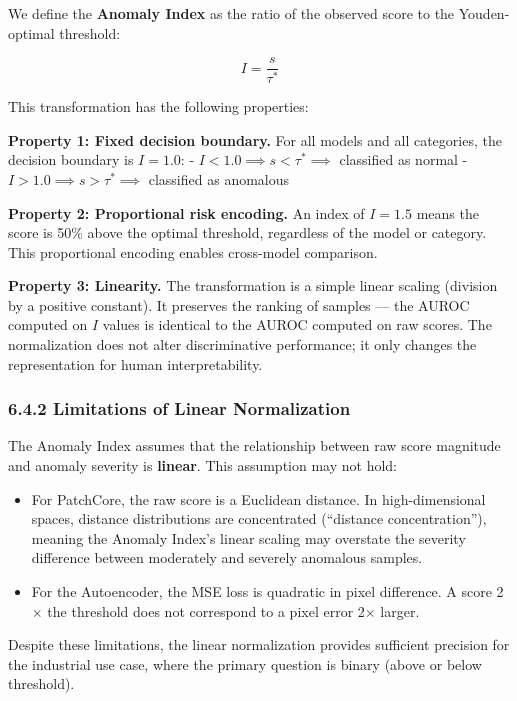 \documentclass[12pt, a4paper, oneside]{report}
\begin{document}
We define the \textbf{Anomaly Index} as the ratio of the observed score to the Youden-optimal threshold:

\[I = \frac{s}{\tau^*}\]

This transformation has the following properties:

\textbf{Property 1: Fixed decision boundary.} For all models and all categories, the decision boundary is \(I = 1.0\): - \(I < 1.0 \implies s < \tau^* \implies\) classified as normal - \(I > 1.0 \implies s > \tau^* \implies\) classified as anomalous

\textbf{Property 2: Proportional risk encoding.} An index of \(I = 1.5\) means the score is 50\% above the optimal threshold, regardless of the model or category. This proportional encoding enables cross-model comparison.

\textbf{Property 3: Linearity.} The transformation is a simple linear scaling (division by a positive constant). It preserves the ranking of samples --- the AUROC computed on \(I\) values is identical to the AUROC computed on raw scores. The normalization does not alter discriminative performance; it only changes the representation for human interpretability.

\subsubsection{6.4.2 Limitations of Linear Normalization}\label{limitations-of-linear-normalization}

The Anomaly Index assumes that the relationship between raw score magnitude and anomaly severity is \textbf{linear}. This assumption may not hold:

\begin{itemize}
\item
  For PatchCore, the raw score is a Euclidean distance. In high-dimensional spaces, distance distributions are concentrated (``distance concentration''), meaning the Anomaly Index's linear scaling may overstate the severity difference between moderately and severely anomalous samples.
\item
  For the Autoencoder, the MSE loss is quadratic in pixel difference. A score 2$\times$ the threshold does not correspond to a pixel error 2$\times$ larger.
\end{itemize}

Despite these limitations, the linear normalization provides sufficient precision for the industrial use case, where the primary question is binary (above or below threshold).
\end{document}
